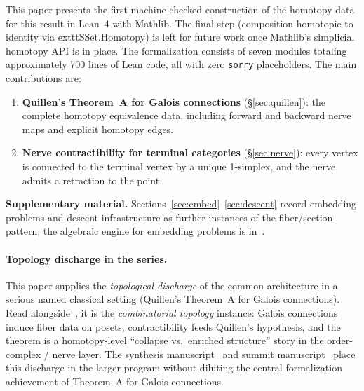 \documentclass[11pt]{article}
\begin{document}
This paper presents the first machine-checked construction of the homotopy data for this result in
Lean~4 with Mathlib. The final step (composition homotopic to identity via 	exttt{SSet.Homotopy}) is left for future work once Mathlib's simplicial homotopy API is in place. The formalization consists of seven modules totaling
approximately 700 lines of Lean code, all with zero \texttt{sorry}
placeholders. The main contributions are:

\begin{enumerate}
  \item \textbf{Quillen's Theorem~A for Galois connections}
    (\S\ref{sec:quillen}): the complete homotopy equivalence data, including
    forward and backward nerve maps and explicit homotopy edges.
  \item \textbf{Nerve contractibility for terminal categories}
    (\S\ref{sec:nerve}): every vertex is connected to the terminal vertex by a
    unique 1-simplex, and the nerve admits a retraction to the point.
\end{enumerate}

\noindent
\textbf{Supplementary material.} Sections~\ref{sec:embed}--\ref{sec:descent} record
embedding problems and descent infrastructure as further instances of the
fiber/section pattern; the algebraic engine for embedding problems is
in~\cite{SpivackFiber}.

\paragraph{Topology discharge in the series.}
This paper supplies the \emph{topological discharge} of the common architecture in a serious
named classical setting (Quillen's Theorem~A for Galois connections). Read
alongside~\cite{SpivackFiber}, it is the \emph{combinatorial topology} instance: Galois
connections induce fiber data on posets, contractibility feeds Quillen's hypothesis, and
the theorem is a homotopy-level ``collapse vs.\ enriched structure'' story in the
order-complex / nerve layer. The synthesis manuscript~\cite{SpivackSynthesis} and summit
manuscript~\cite{SpivackSummit} place this discharge in the larger program without diluting
the central formalization achievement of Theorem~A for Galois connections.
\end{document}
